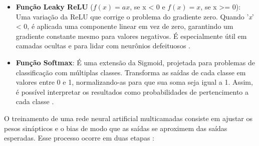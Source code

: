 \begin{itemize}
    \item \textbf{Função Leaky ReLU} ($f(x) = ax$, se x < 0 e $f(x) = x$, se x >= 0): Uma variação da ReLU que corrige o problema do gradiente zero. Quando '\textit{x}' < 0, é aplicada uma componente linear em vez de zero, garantindo um gradiente constante mesmo para valores negativos. É especialmente útil em camadas ocultas e para lidar com neurônios defeituosos \cite{feng2019}.

    \item \textbf{Função Softmax}: É uma extensão da Sigmoid, projetada para problemas de classificação com múltiplas classes. Transforma as saídas de cada classe em valores entre 0 e 1, normalizando-as para que sua soma seja igual a 1. Assim, é possível interpretar os resultados como probabilidades de pertencimento a cada classe \cite{feng2019}.
\end{itemize}

O treinamento de uma rede neural artificial multicamadas consiste em ajustar os pesos sinápticos e o bias de modo que as saídas se aproximem das saídas esperadas. Esse processo ocorre em duas etapas \cite{russel2010}:

